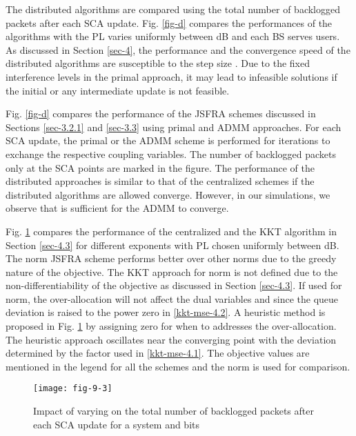 The distributed algorithms are compared using the total number of backlogged packets after each \ac{SCA} update. Fig. \ref{fig-d} compares the performances of the algorithms with the \ac{PL} varies uniformly between \me{[0,-6]} dB and each \ac{BS} serves  users. As discussed in Section \ref{sec-4}, the performance and the convergence speed of the distributed algorithms are susceptible to the step size . Due to the fixed interference levels in the primal approach, it may lead to infeasible solutions if the initial or any intermediate update is not feasible.

Fig. \ref{fig-d} compares the performance of the \ac{JSFRA} schemes discussed in Sections \ref{sec-3.2.1} and \ref{sec-3.3} using primal and \ac{ADMM} approaches. For each \ac{SCA} update, the primal or the \ac{ADMM} scheme is performed for  iterations to exchange the respective coupling variables. The number of backlogged packets only at the \ac{SCA} points are marked in the figure. The performance of the distributed approaches is similar to that of the centralized schemes if the distributed algorithms are allowed converge. However, in our simulations, we observe that  is sufficient for the \ac{ADMM} to converge. 


Fig. \ref{fig-d-3.1} compares the performance of the centralized and the \ac{KKT} algorithm in Section \ref{sec-4.3} for different exponents with \ac{PL} chosen uniformly between \me{[0,-3]} dB. The  norm \ac{JSFRA} scheme performs better over other  norms due to the greedy nature of the objective. The \ac{KKT} approach for  norm is not defined due to the non-differentiability of the objective as discussed in Section \ref{sec-4.3}. If used for  norm, the over-allocation will not affect the dual variables  and  since the queue deviation is raised to the power zero in \eqref{kkt-mse-4.2}. A heuristic method is proposed in Fig. \ref{fig-d-3.1} by assigning zero for  when  to addresses the over-allocation. The heuristic approach oscillates near the converging point with the deviation determined by the factor \me{\rho} used in \eqref{kkt-mse-4.1}. The objective values are mentioned in the legend for all the schemes and the  norm is used for comparison.
\begin{figure}
	\centering
	\texttt{[image: fig-9-3]}
	\vspace{-0.2in}
	\caption{Impact of varying  on the total number of backlogged packets after each \ac{SCA} update for a system  and  bits}
	\label{fig-d-3.1}
\end{figure}

